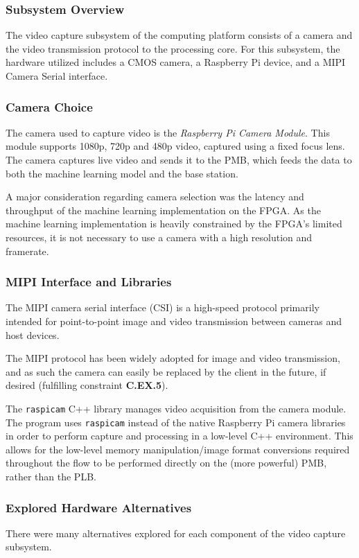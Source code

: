 \subsubsection{Subsystem Overview}
The video capture subsystem of the computing platform consists of a camera and the video transmission protocol to the processing core. For this subsystem, the hardware utilized includes a CMOS camera, a Raspberry Pi device, and a MIPI Camera Serial interface. 

\subsubsection{Camera Choice}
The camera used to capture video is the \textit{Raspberry Pi Camera Module}. This module supports 1080p, 720p and 480p video, captured using a fixed focus lens. The camera captures live video and sends it to the PMB, which feeds the data to both the machine learning model and the base station.

A major consideration regarding camera selection was the latency and throughput of the machine learning implementation on the FPGA. As the machine learning implementation is heavily constrained by the FPGA's limited resources, it is not necessary to use a camera with a high resolution and framerate.

\subsubsection{MIPI Interface and Libraries}
The MIPI camera serial interface (CSI) is a high-speed protocol primarily intended for point-to-point image and video transmission between cameras and host devices. 

The MIPI protocol has been widely adopted for image and video transmission, and as such the camera can easily be replaced by the client in the future, if desired (fulfilling constraint \textbf{C.EX.5}).

The \texttt{raspicam} C++ library manages video acquisition from the camera module. The program uses \texttt{raspicam} instead of the native Raspberry Pi camera libraries in order to perform capture and processing in a low-level C++ environment. This allows for the low-level memory manipulation/image format conversions required throughout the flow to be performed directly on the (more powerful) PMB, rather than the PLB.

\subsubsection{Explored Hardware Alternatives}
There were many alternatives explored for each component of the video capture subsystem.

